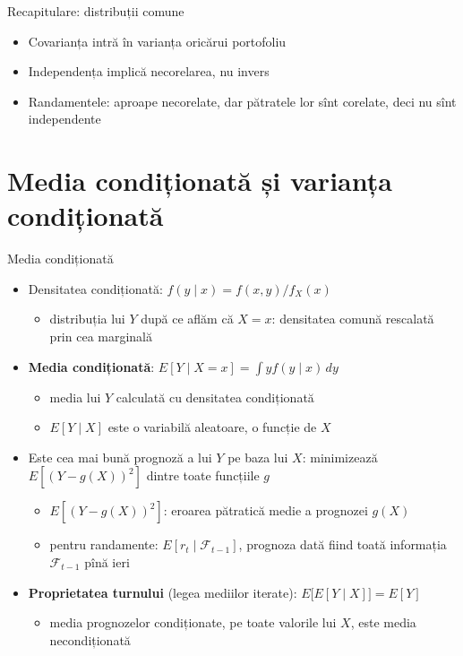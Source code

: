 \begin{frame}{Recapitulare: distribuții comune}
\itemsize{\small}
\begin{itemize}
    \item Covarianța intră în varianța oricărui portofoliu
    \item Independența implică necorelarea, nu invers
    \item Randamentele: aproape necorelate, dar pătratele lor sînt corelate, deci nu sînt independente
\end{itemize}
\end{frame}


\section{Media condiționată și varianța condiționată}

\begin{frame}{Media condiționată}
\itemsize{\footnotesize}
\begin{itemize}
    \item Densitatea condiționată: $f(y \mid x) = f(x, y)/f_X(x)$
    \begin{itemize}
        \item distribuția lui $Y$ după ce aflăm că $X = x$: densitatea comună rescalată prin cea marginală
    \end{itemize}
    \item \textbf{Media condiționată}: $E[Y \mid X = x] = \int y f(y \mid x)\,dy$
    \begin{itemize}
        \item media lui $Y$ calculată cu densitatea condiționată
        \item $E[Y \mid X]$ este o variabilă aleatoare, o funcție de $X$
    \end{itemize}
    \item Este cea mai bună prognoză a lui $Y$ pe baza lui $X$: minimizează $E[(Y - g(X))^2]$ dintre toate funcțiile $g$
    \begin{itemize}
        \item $E[(Y - g(X))^2]$: eroarea pătratică medie a prognozei $g(X)$
        \item pentru randamente: $E[r_t \mid \mathcal{F}_{t-1}]$, prognoza dată fiind toată informația $\mathcal{F}_{t-1}$ pînă ieri
    \end{itemize}
    \item \textbf{Proprietatea turnului} (legea mediilor iterate): $E\big[E[Y \mid X]\big] = E[Y]$
    \begin{itemize}
        \item media prognozelor condiționate, pe toate valorile lui $X$, este media necondiționată
    \end{itemize}
\end{itemize}
\end{frame}

